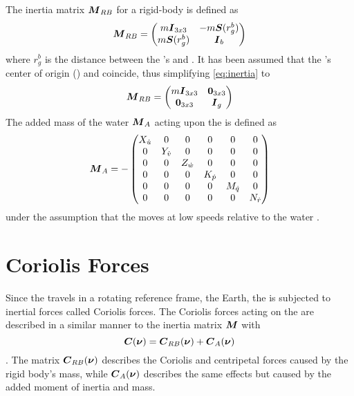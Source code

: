 The inertia matrix $\boldsymbol{M}_{RB}$ for a rigid-body is defined as
\begin{equation}
\label{eq:inertia}
    \boldsymbol{M}_{RB} = 
    \begin{pmatrix}
    m\boldsymbol{I}_{3x3}       & -m\boldsymbol{S}(r^b_g) \\
    m\boldsymbol{S}(r^b_g) & \boldsymbol{I}_{b}
    \end{pmatrix}
\end{equation}
where $r^b_g$ is the distance between the \abbrROV's \abbrCO and \abbrCG \citep[p. 52]{fossen2011}.
It has been assumed that the \abbrROV's center of origin (\abbrCO) and \abbrCG coincide, thus simplifying \eqref{eq:inertia} to
\begin{equation}
   \boldsymbol{M}_{RB} = 
    \begin{pmatrix}
        m\boldsymbol{I}_{3x3} & \boldsymbol{0}_{3x3} \\
        \boldsymbol{0}_{3x3} & \boldsymbol{I}_{g}
    \end{pmatrix}
\end{equation} 
The added mass of the water $\boldsymbol{M}_A$ acting upon the \abbrROV is defined as
\begin{equation}
\boldsymbol{M}_A =
-\begin{pmatrix}
    X_{\dot{u}} & 0 & 0 & 0 & 0 & 0 \\
    0 & Y_{\dot{v}} & 0 & 0 & 0 & 0 \\
    0 & 0 & Z_{\dot{w}} & 0 & 0 & 0 \\
    0 & 0 & 0 & K_{\dot{p}}& 0 & 0 \\
    0 & 0 & 0 & 0 & M_{\dot{q}} & 0 \\
    0 & 0 & 0 & 0 & 0 & N_{\dot{r}} \\
    \end{pmatrix}
\end{equation}
under the assumption that the \abbrROV moves at low speeds relative to the water \citep[p. 121]{fossen2011}.
\section{Coriolis Forces}
Since the \abbrROV travels in a rotating reference frame, the Earth, the \abbrROV is subjected to inertial forces called Coriolis forces. The Coriolis forces acting on the \abbrROV are described in a similar manner to the inertia matrix $\boldsymbol{M}$ with
\begin{equation}
    \boldsymbol{C}(\boldsymbol{\nu}) = \boldsymbol{C}_{RB}(\boldsymbol{\nu}) + \boldsymbol{C}_A(\boldsymbol{\nu})
\end{equation}\citep[p. 110]{fossen2011}. The matrix $\boldsymbol{C}_{RB}(\boldsymbol{\nu})$ describes the Coriolis and centripetal forces caused by the rigid body's mass, while $\boldsymbol{C}_A(\boldsymbol{\nu})$ describes the same effects but caused by the added moment of inertia and mass.


